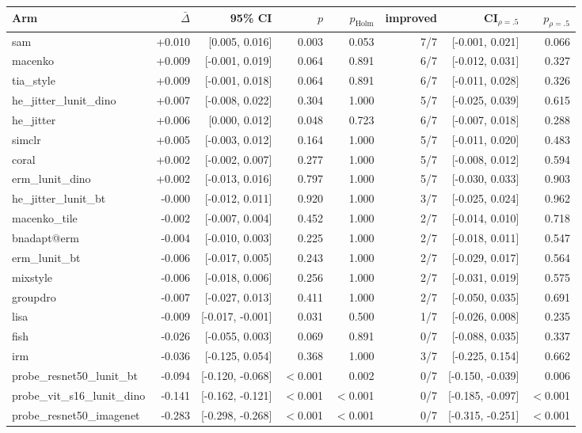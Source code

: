 \begin{tabular}{lrrrrrrr}
\toprule
Arm & $\bar\Delta$ & 95\% CI & $p$ & $p_\text{Holm}$ & improved & CI$_{\rho=.5}$ & $p_{\rho=.5}$ \\
\midrule
sam & +0.010 & [0.005, 0.016] & 0.003 & 0.053 & 7/7 & [-0.001, 0.021] & 0.066 \\
macenko & +0.009 & [-0.001, 0.019] & 0.064 & 0.891 & 6/7 & [-0.012, 0.031] & 0.327 \\
tia\_style & +0.009 & [-0.001, 0.018] & 0.064 & 0.891 & 6/7 & [-0.011, 0.028] & 0.326 \\
he\_jitter\_lunit\_dino & +0.007 & [-0.008, 0.022] & 0.304 & 1.000 & 5/7 & [-0.025, 0.039] & 0.615 \\
he\_jitter & +0.006 & [0.000, 0.012] & 0.048 & 0.723 & 6/7 & [-0.007, 0.018] & 0.288 \\
simclr & +0.005 & [-0.003, 0.012] & 0.164 & 1.000 & 5/7 & [-0.011, 0.020] & 0.483 \\
coral & +0.002 & [-0.002, 0.007] & 0.277 & 1.000 & 5/7 & [-0.008, 0.012] & 0.594 \\
erm\_lunit\_dino & +0.002 & [-0.013, 0.016] & 0.797 & 1.000 & 5/7 & [-0.030, 0.033] & 0.903 \\
he\_jitter\_lunit\_bt & -0.000 & [-0.012, 0.011] & 0.920 & 1.000 & 3/7 & [-0.025, 0.024] & 0.962 \\
macenko\_tile & -0.002 & [-0.007, 0.004] & 0.452 & 1.000 & 2/7 & [-0.014, 0.010] & 0.718 \\
bnadapt@erm & -0.004 & [-0.010, 0.003] & 0.225 & 1.000 & 2/7 & [-0.018, 0.011] & 0.547 \\
erm\_lunit\_bt & -0.006 & [-0.017, 0.005] & 0.243 & 1.000 & 2/7 & [-0.029, 0.017] & 0.564 \\
mixstyle & -0.006 & [-0.018, 0.006] & 0.256 & 1.000 & 2/7 & [-0.031, 0.019] & 0.575 \\
groupdro & -0.007 & [-0.027, 0.013] & 0.411 & 1.000 & 2/7 & [-0.050, 0.035] & 0.691 \\
lisa & -0.009 & [-0.017, -0.001] & 0.031 & 0.500 & 1/7 & [-0.026, 0.008] & 0.235 \\
fish & -0.026 & [-0.055, 0.003] & 0.069 & 0.891 & 0/7 & [-0.088, 0.035] & 0.337 \\
irm & -0.036 & [-0.125, 0.054] & 0.368 & 1.000 & 3/7 & [-0.225, 0.154] & 0.662 \\
probe\_resnet50\_lunit\_bt & -0.094 & [-0.120, -0.068] & $<$0.001 & 0.002 & 0/7 & [-0.150, -0.039] & 0.006 \\
probe\_vit\_s16\_lunit\_dino & -0.141 & [-0.162, -0.121] & $<$0.001 & $<$0.001 & 0/7 & [-0.185, -0.097] & $<$0.001 \\
probe\_resnet50\_imagenet & -0.283 & [-0.298, -0.268] & $<$0.001 & $<$0.001 & 0/7 & [-0.315, -0.251] & $<$0.001 \\
\bottomrule
\end{tabular}
